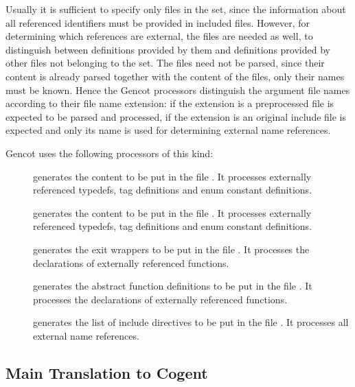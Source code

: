 Usually it is sufficient to specify only  files in the set, since the information about all referenced 
identifiers must be provided in included  files. However, for determining which references are external, the
 files are needed as well, to distinguish between definitions provided by them and definitions provided
by other  files not belonging to the set. The  files need not be parsed, since their content is
already parsed together with the content of the  files, only their names must be known. Hence the Gencot
processors distinguish the argument file names according to their file name extension: if the extension is 
 a preprocessed  file is expected to be parsed and processed, if the extension is 
an original include file is expected and only its name is used for determining external name references.

Gencot uses the following processors of this kind:
\begin{description}
\item[] generates the content to be put in the file . It 
processes externally referenced typedefs, tag definitions and enum constant definitions.
\item[] generates the content to be put in the file . It 
processes externally referenced typedefs, tag definitions and enum constant definitions.
\item[] generates the exit wrappers to be put in the file . It processes
the declarations of externally referenced functions.
\item[] generates the abstract function definitions to be put in the file 
. It processes the declarations of externally referenced functions.
\item[] generates the list of include directives to be put in the file
. It processes all external name references. 
\end{description}

\subsection{Main Translation to Cogent}
\label{impl-comps-main}

